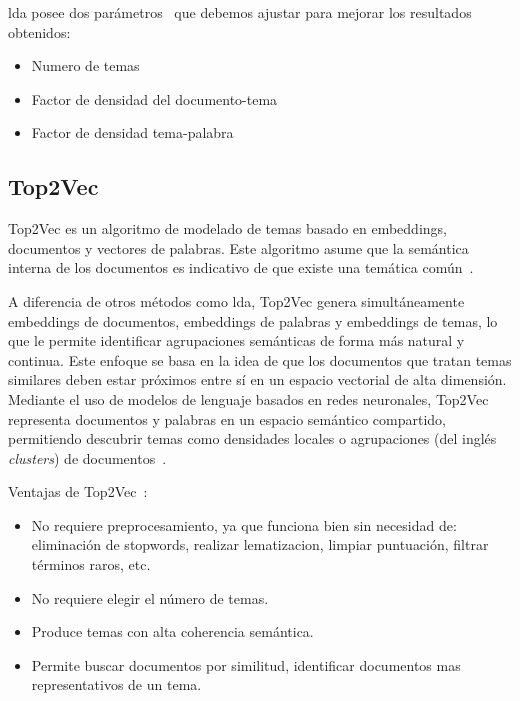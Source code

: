 \acrshort{lda} posee dos parámetros~\cite{bhangaleIntroductionTopicModelling2023} que
debemos ajustar para mejorar los resultados obtenidos:
\begin{itemize}
	\item Numero de temas
	\item Factor de densidad del documento-tema
	\item Factor de densidad tema-palabra
\end{itemize}

\subsection{Top2Vec}\label{sec:top2vec}

Top2Vec es un algoritmo de modelado de temas basado en \gls{embeddings},
documentos y vectores de palabras. Este algoritmo asume que la semántica
interna de los documentos es indicativo de que existe una temática
común~\cite{gTop2vecTopicModeling2022}.

A diferencia de otros métodos como \acrshort{lda}, Top2Vec genera
simultáneamente \gls{embeddings} de documentos, \gls{embeddings} de palabras y
\gls{embeddings} de temas, lo que le permite identificar agrupaciones
semánticas de forma más natural y continua. Este enfoque se basa en la idea de
que los documentos que tratan temas similares deben estar próximos entre sí en
un espacio vectorial de alta dimensión. Mediante el uso de modelos de lenguaje
basados en redes neuronales, Top2Vec representa documentos y palabras en un
espacio semántico compartido, permitiendo descubrir temas como densidades
locales o agrupaciones (del inglés \textit{clusters}) de
documentos~\cite{angelovTop2VecDistributedRepresentations2020}.

Ventajas de Top2Vec~\cite{angelovTop2VecDistributedRepresentations2020}:
\begin{itemize}
	\item No requiere preprocesamiento, ya que funciona bien sin necesidad de:
	      eliminación de \gls{stopwords}, realizar \gls{lematizacion}, limpiar
	      puntuación, filtrar términos raros, etc.
	\item No requiere elegir el número de temas.
	\item Produce temas con alta \gls{coherencia} semántica.
	\item Permite buscar documentos por similitud, identificar documentos mas
	      representativos de un tema.
\end{itemize}

